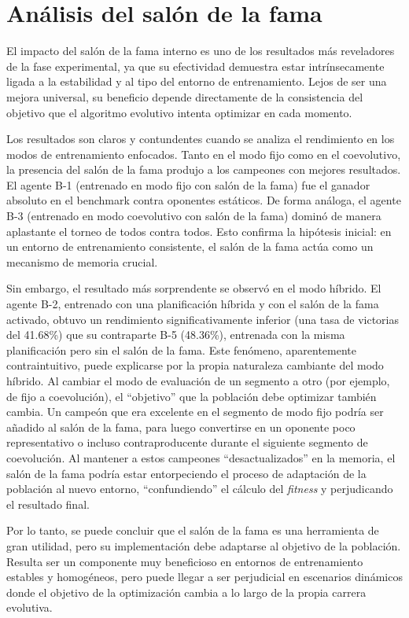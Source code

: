\section{Análisis del salón de la fama} \label{sec:analisis_salon_fama}

El impacto del salón de la fama interno es uno de los resultados más reveladores de la fase experimental, ya que su efectividad demuestra estar intrínsecamente ligada a la estabilidad y al tipo del entorno de entrenamiento. Lejos de ser una mejora universal, su beneficio depende directamente de la consistencia del objetivo que el algoritmo evolutivo intenta optimizar en cada momento.

Los resultados son claros y contundentes cuando se analiza el rendimiento en los modos de entrenamiento enfocados. Tanto en el modo fijo como en el coevolutivo, la presencia del salón de la fama produjo a los campeones con mejores resultados. El agente B-1 (entrenado en modo fijo con salón de la fama) fue el ganador absoluto en el benchmark contra oponentes estáticos. De forma análoga, el agente B-3 (entrenado en modo coevolutivo con salón de la fama) dominó de manera aplastante el torneo de todos contra todos. Esto confirma la hipótesis inicial: en un entorno de entrenamiento consistente, el salón de la fama actúa como un mecanismo de memoria crucial.

Sin embargo, el resultado más sorprendente se observó en el modo híbrido. El agente B-2, entrenado con una planificación híbrida y con el salón de la fama activado, obtuvo un rendimiento significativamente inferior (una tasa de victorias del 41.68\%) que su contraparte B-5 (48.36\%), entrenada con la misma planificación pero sin el salón de la fama. Este fenómeno, aparentemente contraintuitivo, puede explicarse por la propia naturaleza cambiante del modo híbrido. Al cambiar el modo de evaluación de un segmento a otro (por ejemplo, de fijo a coevolución), el ``objetivo'' que la población debe optimizar también cambia. Un campeón que era excelente en el segmento de modo fijo podría ser añadido al salón de la fama, para luego convertirse en un oponente poco representativo o incluso contraproducente durante el siguiente segmento de coevolución. Al mantener a estos campeones ``desactualizados'' en la memoria, el salón de la fama podría estar entorpeciendo el proceso de adaptación de la población al nuevo entorno, ``confundiendo'' el cálculo del \textit{fitness} y perjudicando el resultado final.

Por lo tanto, se puede concluir que el salón de la fama es una herramienta de gran utilidad, pero su implementación debe adaptarse al objetivo de la población. Resulta ser un componente muy beneficioso en entornos de entrenamiento estables y homogéneos, pero puede llegar a ser perjudicial en escenarios dinámicos donde el objetivo de la optimización cambia a lo largo de la propia carrera evolutiva.

